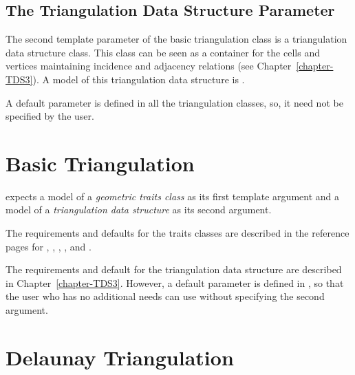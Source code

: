 \subsection{The Triangulation Data Structure Parameter}
\label{Triangulation3-sec-tds}

The second template parameter of the basic triangulation class
 is a triangulation 
data structure class.  This class can be seen as a container for the
cells and vertices maintaining incidence and adjacency relations (see
Chapter~\ref{chapter-TDS3}).  A model of this triangulation data
structure is .

A default parameter is defined in all the triangulation classes, so, it 
need not be specified by the user. 

\section{Basic Triangulation}

 expects a model of a 
\textit{geometric traits class} as its first template argument and a model 
of a \textit{triangulation data structure} as its second argument.

The requirements and defaults for the traits classes are described in
the reference pages for 
,
, 
,
 , 
and
.

The requirements and default for the triangulation data structure are
described in Chapter~\ref{chapter-TDS3}. However, a default parameter
is defined in , so that the user who 
has no additional needs can use
 without specifying the 
second argument.

\section{Delaunay Triangulation} 

